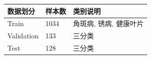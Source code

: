 \begin{tabular}{p{}p{}p{}}
\toprule
数据划分 & 样本数 & 类别说明 \\
\midrule
Train & 1034 & 角斑病, 锈病, 健康叶片 \\
Validation & 133 & 三分类 \\
Test & 128 & 三分类 \\
\bottomrule
\end{tabular}
